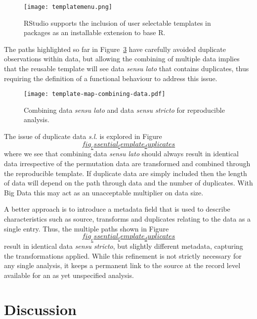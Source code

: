 \documentclass[
]{article}
\begin{document}
\begin{figure}
\hypertarget{fig_RStudio_template_menu}{%
\centering
\texttt{[image: templatemenu.png]}
\caption{RStudio supports the inclusion of user selectable templates in
packages as an installable extension to base
R.}\label{fig_RStudio_template_menu}
}
\end{figure}

The paths highlighted so far in
Figure~\protect\hyperlink{fig_essential_template}{3} have carefully
avoided duplicate observations within data, but allowing the combining
of multiple data implies that the reusable template will see data
\emph{sensu lato} that contains duplicates, thus requiring the
definition of a functional behaviour to address this issue.

\begin{figure}
\hypertarget{fig_essential_template_base_combining_data}{%
\centering
\texttt{[image: template-map-combining-data.pdf]}
\caption{Combining data \emph{sensu lato} and data \emph{sensu stricto}
for reproducible
analysis.}\label{fig_essential_template_base_combining_data}
}
\end{figure}

The issue of duplicate data \emph{s.l.} is explored in
Figure~\protect\hyperlink{fig_essential_template_duplicates}{\[fig_essential_template_duplicates\]}
where we see that combining data \emph{sensu lato} should always result
in identical data irrespective of the permutation data are transformed
and combined through the reproducible template. If duplicate data are
simply included then the length of data will depend on the path through
data and the number of duplicates. With Big Data this may act as an
unacceptable multiplier on data size.

A better approach is to introduce a metadata field that is used to
describe characteristics such as source, transforms and duplicates
relating to the data as a single entry. Thus, the multiple paths shown
in
Figure~\protect\hyperlink{fig_essential_template_duplicates}{\[fig_essential_template_duplicates\]}
result in identical data \emph{sensu stricto}, but slightly different
metadata, capturing the transformations applied. While this refinement
is not strictly necessary for any single analysis, it keeps a permanent
link to the source at the record level available for an as yet
unspecified analysis.

\hypertarget{sec:discussion}{%
\section{Discussion}\label{sec:discussion}}
\end{document}
